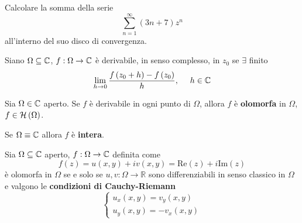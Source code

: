 Calcolare la somma della serie
\begin{equation*}
\sum\limits ^{\infty }_{n=1}\left( 3n+7\right) z^{n}
\end{equation*}
all'interno del suo disco di convergenza.
\ParteSoluzioni
\Soluzione
\begin{defn}
Siano $\Omega \subseteq \mathbb{C} $, $f:\Omega \rightarrow \mathbb{C} $ è derivabile, in senso complesso, in $z_{0}$ se $\exists $ finito
\begin{equation*}
\lim\limits _{h\rightarrow 0}\frac{f\left( z_{0} +h\right) -f\left( z_{0}\right)}{h} ,\ \ \ \ h\in \mathbb{C} 
\end{equation*}
\end{defn}
\begin{defn}
Sia $\Omega \in \mathbb{C} $ aperto. Se $f$ è derivabile in ogni punto di $\Omega $, allora $f$ è \textbf{olomorfa} in $\Omega $, $f\in \mathcal{H} \left( \Omega \right)$.
\end{defn}
\begin{rem}
Se $\Omega \equiv \mathbb{C} $ allora $f$ è \textbf{intera}.
\end{rem}
\begin{thm}
 Sia $\Omega \subseteq \mathbb{C} $ aperto, $f:\Omega \rightarrow \mathbb{C} $ definita come
\begin{equation*}
f\left( z\right) =u\left( x,y\right) +iv\left( x,y\right) =\mathrm{Re}\left( z\right) +i\mathrm{Im}\left( z\right)
\end{equation*}
è olomorfa in $\Omega $ se e solo se $u,v:\Omega \rightarrow \mathbb{R}$ sono differenziabili in senso classico in $\Omega $ e valgono le \textbf{condizioni di Cauchy-Riemann}
\begin{equation}
\begin{cases}
u_{x}\left( x,y\right) =v_{y}\left( x,y\right)\\
u_{y}\left( x,y\right) =-v_{x}\left( x,y\right)
\end{cases}
\end{equation}
\end{thm}
